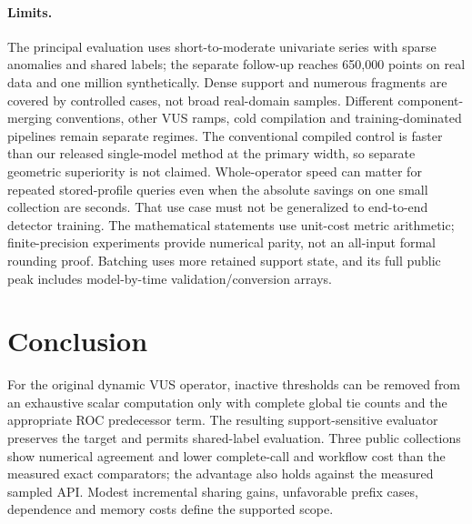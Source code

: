 \paragraph{Limits.}
The principal evaluation uses short-to-moderate univariate series with sparse
anomalies and shared labels; the separate follow-up reaches 650,000 points on
real data and one million synthetically. Dense support and numerous fragments
are covered by controlled cases, not broad real-domain samples. Different
component-merging conventions, other VUS ramps, cold compilation and
training-dominated pipelines remain separate regimes. The conventional compiled
control is faster than our released single-model method at the primary width,
so separate geometric superiority is not claimed. Whole-operator speed can
matter for repeated stored-profile queries even when the absolute savings on
one small collection are seconds. That use case must not be generalized to
end-to-end detector training. The mathematical statements use unit-cost metric
arithmetic; finite-precision experiments provide numerical parity, not an
all-input formal rounding proof. Batching uses more retained support state,
and its full public peak includes model-by-time validation/conversion arrays.

\section{Conclusion}
For the original dynamic VUS operator, inactive thresholds can be removed from
an exhaustive scalar computation only with complete global tie counts and the
appropriate ROC predecessor term. The resulting support-sensitive evaluator
preserves the target and permits shared-label evaluation. Three public
collections show numerical agreement and lower complete-call and workflow
cost than the measured exact comparators; the advantage also holds against the
measured sampled API. Modest incremental sharing gains, unfavorable prefix
cases, dependence and memory costs define the supported scope.

